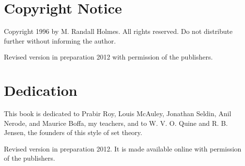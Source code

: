 \section{Copyright Notice}

Copyright 1996 by M. Randall Holmes.  All rights reserved.  Do not
distribute further without informing the author.

Revised version in preparation 2012 with permission of the publishers.

\section{Dedication}

This book is dedicated to Prabir Roy, Louis McAuley, Jonathan Seldin,
Anil Nerode, and Maurice Boffa, my teachers, and to W. V. O. Quine and
R. B. Jensen, the founders of this style of set theory.

Revised version in preparation 2012.  It is made available online with permission of the publishers.

